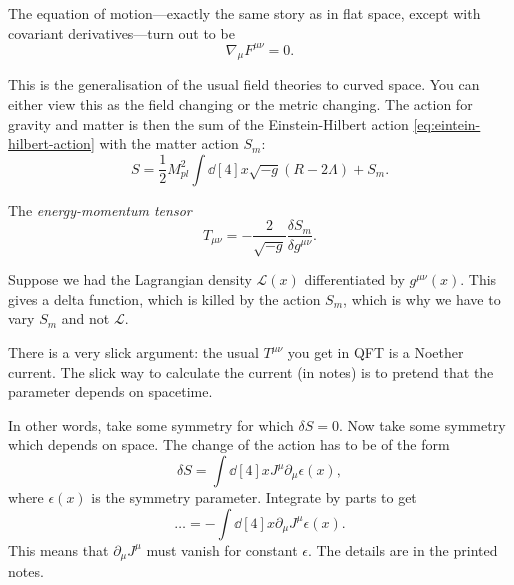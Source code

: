 The equation of motion---exactly the same story as in flat space, except with covariant derivatives---turn out to be
\begin{equation}
  \nabla_{\mu} F^{\mu\nu} = 0.
\end{equation}

This is the generalisation of the usual field theories to curved space.
You can either view this as the field changing or the metric changing.
The action for gravity and matter is then the sum of the Einstein-Hilbert action \eqref{eq:eintein-hilbert-action} with the matter action $S_m$:
\begin{equation}
  S = \frac{1}{2} M_{pl}^2 \int \dd[4]{x} \sqrt{-g} (R - 2 \Lambda) + S_m.
\end{equation}

\begin{definition}[]
  The \emph{energy-momentum tensor}
  \begin{equation}
    T_{\mu\nu} = - \frac{2}{\sqrt{-g}} \frac{\delta S_m}{\delta g^{\mu\nu}}.
  \end{equation}
\end{definition}
\begin{leftbar}
  \begin{note}
    Suppose we had the Lagrangian density $\mathcal{L}(x)$ differentiated by $g^{\mu\nu}(x)$. This gives a delta function, which is killed by the action $S_m$, which is why we have to vary  $S_m$ and not $\mathcal{L}$.
  \end{note}
\end{leftbar}
\begin{remark}
  There is a very slick argument: the usual $T^{\mu\nu}$ you get in QFT is a Noether current. The slick way to calculate the current (in notes) is to pretend that the parameter depends on spacetime.

  In other words, take some symmetry for which $\delta S = 0$. Now take some symmetry which depends on space. The change of the action has to be of the form
   \begin{equation}
     \delta S = \int \dd[4]{x} J^{\mu} \partial_{\mu} \epsilon(x),
  \end{equation}
  where $\epsilon(x)$ is the symmetry parameter. Integrate by parts to get
  \begin{equation}
    \dots = - \int \dd[4]{x} \partial_{\mu} J^{\mu} \epsilon (x).
  \end{equation}
  This means that $\partial_{\mu} J^{\mu}$ must vanish for constant $\epsilon$.
  The details are in the printed notes.
\end{remark}

